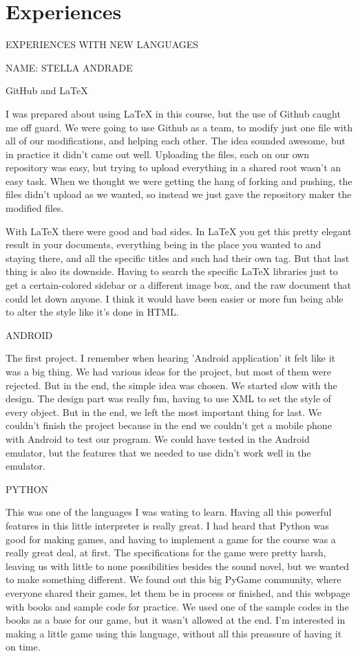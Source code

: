 
\chapter{Experiences}

EXPERIENCES WITH NEW LANGUAGES

NAME:         STELLA ANDRADE


GitHub and LaTeX

I was prepared about using LaTeX in this course, but the use of Github caught me off guard.
We were going to use Github as a team, to modify just one file with all of our modifications, and helping each other. The idea sounded awesome, but in practice it didn't came out well. Uploading the files, each on our own repository was easy, but trying to upload everything in a shared root wasn't an easy task. When we thought we were getting the hang of forking and pushing, the files didn't upload as we wanted, so instead we just gave the repository maker the modified files.

With LaTeX there were good and bad sides. In LaTeX you get this pretty elegant result in your documents, everything being in the place you wanted to and staying there, and all the specific titles and such had their own tag. But that last thing is also its downside. Having to search the specific LaTeX libraries just to get a certain-colored sidebar or a different image box, and the raw document that could let down anyone. I think it would have been easier or more fun being able to alter the style like it's done in HTML.


ANDROID

The first project. I remember when hearing 'Android application' it felt like it was a big thing.
We had various ideas for the project, but most of them were rejected. But in the end, the simple idea was chosen.
We started slow with the design. The design part was really fun, having to use XML to set the style of every object. But in the end, we left the most important thing for last.
We couldn't finish the project because in the end we couldn't get a mobile phone with Android to test our program. We could have tested in the Android emulator, but the features that we needed to use didn't work well in the emulator.


PYTHON

This was one of the languages I was wating to learn. Having all this powerful features in this little interpreter is really great.
I had heard that Python was good for making games, and having to implement a game for the course was a really great deal, at first.
The specifications for the game were pretty harsh, leaving us with little to none possibilities besides the sound novel, but we wanted to make something different. We found out this big PyGame community, where everyone shared their games, let them be in process or finished, and this webpage with books and sample code for practice. We used one of the sample codes in the books as a base for our game, but it wasn't allowed at the end.
I'm interested in making a little game using this language, without all this preassure of having it on time.


